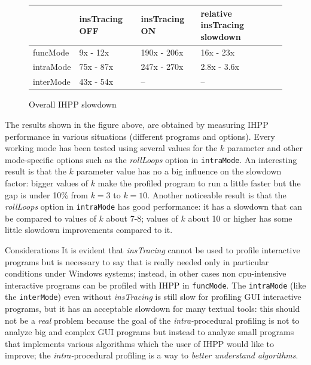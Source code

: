 \documentclass[a4paper,10pt]{report}
\begin{document}
\begin{figure}[H]

\centering

{\renewcommand{\arraystretch}{1.2}
\renewcommand{\tabcolsep}{0.2cm}
\begin{tabular}{l|l|l|l}
& insTracing OFF & insTracing ON & relative insTracing slowdown\\
\hline
funcMode & 9x - 12x & 190x - 206x & 16x - 23x\\
intraMode & 75x - 87x & 247x - 270x & 2.8x - 3.6x\\
interMode & 43x - 54x & -- & --\\
\end{tabular}}

\caption{Overall IHPP slowdown}
\label{totalslowdown}
\end{figure}

\noindent
The results shown in the figure above, are obtained by measuring 
IHPP performance in various situations (different programs and options).
Every working mode has been tested using 
several values for the $k$ parameter and other mode-specific options
such as the \emph{rollLoops} option in \verb|intraMode|. 
An interesting result is that the $k$ parameter value has no a
big influence on the slowdown factor: bigger values of $k$ make
the profiled program to run a little faster but the gap is under 10\%
from $k=3$ to $k=10$. Another noticeable result is that 
the \emph{rollLoops} option in \verb|intraMode| has good performance: 
it has a slowdown that can be compared to values of $k$ about 7-8; 
values of $k$ about 10 or higher has some little slowdown improvements compared to it.

\begin{paragraph}{Considerations}
It is evident that \emph{insTracing} cannot be used to profile 
interactive programs but is necessary to say that is really needed 
only in particular conditions under Windows systems; instead,
in other cases non cpu-intensive interactive programs can be profiled with IHPP
in \verb|funcMode|. The \verb|intraMode| (like the \verb|interMode|) even without \emph{insTracing} is still slow for profiling GUI interactive programs, 
but it has an acceptable slowdown for
many textual tools: this should not be a \emph{real} problem because 
the goal of the \emph{intra-}procedural profiling is not to analyze big and complex
GUI programs but instead to analyze small programs that 
implements various algorithms which the user of IHPP would like to improve;
the \emph{intra-}procedural profiling is a way to \emph{better understand algorithms}.
\end{paragraph}
\end{document}

